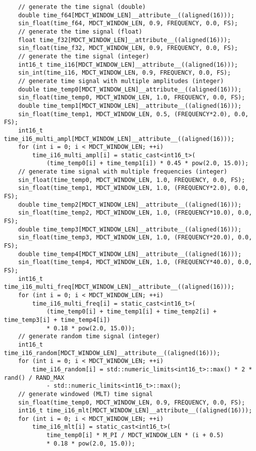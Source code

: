 \documentclass{article}
\begin{document}
\begin{lstlisting}
    // generate the time signal (double)
    double time_f64[MDCT_WINDOW_LEN]__attribute__((aligned(16)));
    sin_float(time_f64, MDCT_WINDOW_LEN, 0.9, FREQUENCY, 0.0, FS);
    // generate the time signal (float)
    float time_f32[MDCT_WINDOW_LEN]__attribute__((aligned(16)));
    sin_float(time_f32, MDCT_WINDOW_LEN, 0.9, FREQUENCY, 0.0, FS);
    // generate the time signal (integer)
    int16_t time_i16[MDCT_WINDOW_LEN]__attribute__((aligned(16)));
    sin_int(time_i16, MDCT_WINDOW_LEN, 0.9, FREQUENCY, 0.0, FS);
    // generate time signal with multiple amplitudes (integer)
    double time_temp0[MDCT_WINDOW_LEN]__attribute__((aligned(16)));
    sin_float(time_temp0, MDCT_WINDOW_LEN, 1.0, FREQUENCY, 0.0, FS);
    double time_temp1[MDCT_WINDOW_LEN]__attribute__((aligned(16)));
    sin_float(time_temp1, MDCT_WINDOW_LEN, 0.5, (FREQUENCY*2.0), 0.0, FS);
    int16_t time_i16_multi_ampl[MDCT_WINDOW_LEN]__attribute__((aligned(16)));
    for (int i = 0; i < MDCT_WINDOW_LEN; ++i)
        time_i16_multi_ampl[i] = static_cast<int16_t>(
            (time_temp0[i] + time_temp1[i]) * 0.45 * pow(2.0, 15.0));
    // generate time signal with multiple frequencies (integer)
    sin_float(time_temp0, MDCT_WINDOW_LEN, 1.0, FREQUENCY, 0.0, FS);
    sin_float(time_temp1, MDCT_WINDOW_LEN, 1.0, (FREQUENCY*2.0), 0.0, FS);
    double time_temp2[MDCT_WINDOW_LEN]__attribute__((aligned(16)));
    sin_float(time_temp2, MDCT_WINDOW_LEN, 1.0, (FREQUENCY*10.0), 0.0, FS);
    double time_temp3[MDCT_WINDOW_LEN]__attribute__((aligned(16)));
    sin_float(time_temp3, MDCT_WINDOW_LEN, 1.0, (FREQUENCY*20.0), 0.0, FS);
    double time_temp4[MDCT_WINDOW_LEN]__attribute__((aligned(16)));
    sin_float(time_temp4, MDCT_WINDOW_LEN, 1.0, (FREQUENCY*40.0), 0.0, FS);
    int16_t time_i16_multi_freq[MDCT_WINDOW_LEN]__attribute__((aligned(16)));
    for (int i = 0; i < MDCT_WINDOW_LEN; ++i)
        time_i16_multi_freq[i] = static_cast<int16_t>(
            (time_temp0[i] + time_temp1[i] + time_temp2[i] + time_temp3[i] + time_temp4[i])
            * 0.18 * pow(2.0, 15.0));
    // generate random time signal (integer)
    int16_t time_i16_random[MDCT_WINDOW_LEN]__attribute__((aligned(16)));
    for (int i = 0; i < MDCT_WINDOW_LEN; ++i)
        time_i16_random[i] = std::numeric_limits<int16_t>::max() * 2 * rand() / RAND_MAX
            - std::numeric_limits<int16_t>::max();
    // generate windowed (MLT) time signal
    sin_float(time_temp0, MDCT_WINDOW_LEN, 0.9, FREQUENCY, 0.0, FS);
    int16_t time_i16_mlt[MDCT_WINDOW_LEN]__attribute__((aligned(16)));
    for (int i = 0; i < MDCT_WINDOW_LEN; ++i)
        time_i16_mlt[i] = static_cast<int16_t>(
            time_temp0[i] * M_PI / MDCT_WINDOW_LEN * (i + 0.5)
            * 0.18 * pow(2.0, 15.0));


\end{lstlisting}
\end{document}
